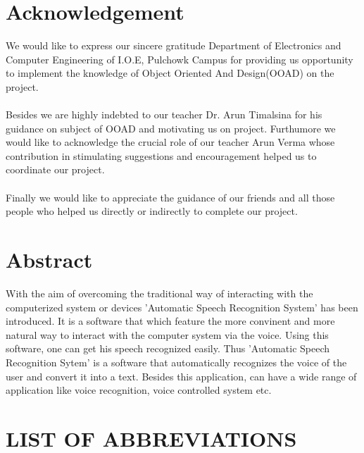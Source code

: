 \documentclass[a4paper,12pt,onepage]{article}
\begin{document}
\section*{Acknowledgement}
	We would like to express our sincere gratitude Department of Electronics and Computer Engineering of I.O.E, Pulchowk Campus for providing us opportunity to implement the knowledge of Object Oriented And Design(OOAD) on the project.
	\\
	\\
	Besides we are highly indebted to our teacher Dr. Arun Timalsina for his guidance on subject of OOAD and motivating us on project. Furthumore we would like to acknowledge the crucial role of our teacher Arun Verma whose contribution in stimulating suggestions and encouragement helped us to coordinate our project.
	\\
	\\
	Finally we would like to appreciate the guidance of our friends and all those people who helped us directly or indirectly to complete our project.

\cleardoublepage
\section*{Abstract}
	With the aim of overcoming the traditional way of interacting with the computerized system or devices 'Automatic Speech Recognition System' has been introduced. It is a software that which feature the more convinent and more natural way to interact with the computer system via the voice.
Using this software, one can get his speech recognized easily. Thus 'Automatic Speech Recognition Sytem' is a software that automatically recognizes the voice of the user and convert it into a text. Besides this application, can have a wide range of application like voice recognition, voice controlled system etc.
\cleardoublepage

{
  \setlength{\parskip}{0em}
  \renewcommand\contentsname{Table of Contents} %
  \tableofcontents {}
}

\cleardoublepage
\setlength{\parskip}{0em}
\listoffigures

\newpage

\section*{LIST OF ABBREVIATIONS}
\end{document}
